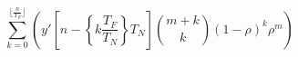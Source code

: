 \documentclass{sigchi}
\begin{document}
\begin{equation}
	\sum_{k=0}^{\lfloor \frac{n}{T_F} \rfloor}\left(y'[n - \left\{ k\frac{T_F}{T_N}\right\} T_N] \binom{m+k}{k} (1 - \rho)^{k} \rho^m\right)
\end{equation}





\end{document}
